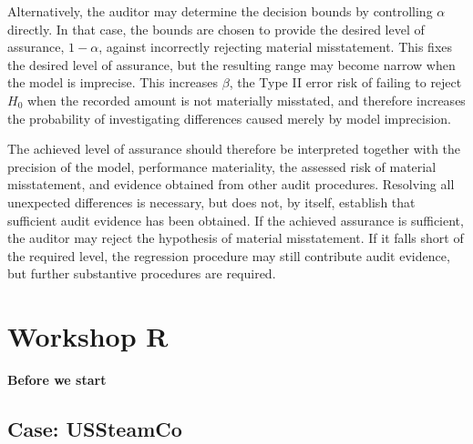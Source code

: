 \bigskip
Alternatively, the auditor may determine the decision bounds by controlling $\alpha$ directly. In that case, the bounds are chosen to provide the desired level of assurance, $1-\alpha$, against incorrectly rejecting material misstatement. This fixes the desired level of assurance, but the resulting range may become narrow when the model is imprecise. This increases $\beta$, the Type II error risk of failing to reject $H_0$ when the recorded amount is not materially misstated, and therefore increases the probability of investigating differences caused merely by model imprecision.

The achieved level of assurance should therefore be interpreted together with the precision of the model, performance materiality, the assessed risk of material misstatement, and evidence obtained from other audit procedures. Resolving all unexpected differences is necessary, but does not, by itself, establish that sufficient audit evidence has been obtained. If the achieved assurance is sufficient, the auditor may reject the hypothesis of material misstatement. If it falls short of the required level, the regression procedure may still contribute audit evidence, but further substantive procedures are required.




\section{Workshop R} %
\label{sec:workshop_7_R}

\begin{exercise}
\label{ex:before_we_start}

\textbf{Before we start}



\end{exercise}

\subsection{Case: USSteamCo}

